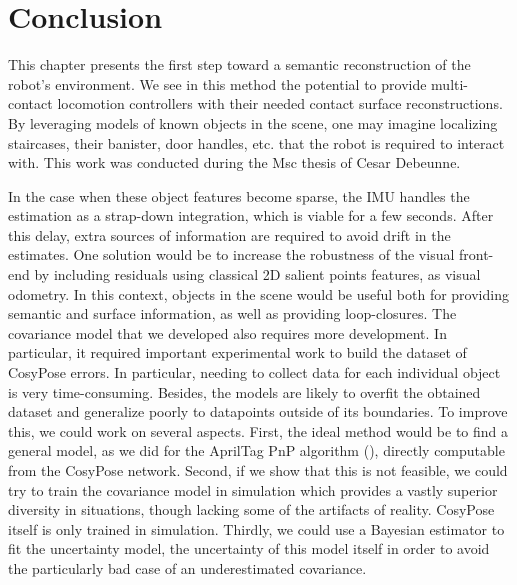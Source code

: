 \section{Conclusion}

This chapter presents the first step toward a semantic reconstruction of the robot's environment. We see in this method the potential to provide multi-contact locomotion controllers \cite{carpentier2017multi}
with their needed contact surface reconstructions. By leveraging models of known objects in the scene, one may imagine localizing staircases, their banister, door handles, etc. that
the robot is required to interact with. This work was conducted during the Msc thesis of Cesar Debeunne.

In the case when these object features become sparse, the IMU handles the estimation as a strap-down integration, which is viable for a few seconds. After this delay, extra sources of information are required
to avoid drift in the estimates. One solution would be to increase the robustness of the visual front-end by including residuals using classical 2D salient points features, as visual odometry. In this context,
objects in the scene would be useful both for providing semantic and surface information, as well as providing loop-closures. The covariance model that we developed also requires more development.
In particular, it required important experimental work to build the dataset of CosyPose errors. In particular, needing to collect data for each individual object is very time-consuming. Besides,
the models are likely to overfit the obtained dataset and generalize poorly to datapoints outside of its boundaries.
To improve this, we could work on several aspects. First, the ideal method would be to find a general model, as we did for the AprilTag PnP algorithm (), directly computable 
from the CosyPose network. Second, if we show that this is not feasible, we could try to train the covariance model in simulation which provides a vastly superior diversity in situations, though lacking
some of the artifacts of reality. CosyPose itself is only trained in simulation. Thirdly, we could use a Bayesian estimator to fit the uncertainty model, the uncertainty of this model itself in order to 
avoid the particularly bad case of an underestimated covariance. 